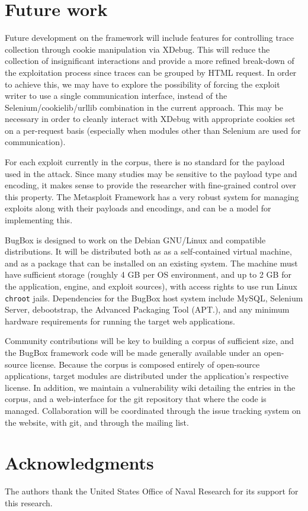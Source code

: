 \documentclass[letterpaper,twocolumn,10pt]{article}
\begin{document}
\section{Future work}
  Future development on the framework will include features for controlling trace collection through cookie manipulation via XDebug. This will reduce the collection of insignificant interactions and provide a more refined break-down of the exploitation process since traces can be grouped by HTML request. In order to achieve this, we may have to explore the possibility of forcing the exploit writer to use a single communication interface, instead of the Selenium/cookielib/urllib combination in the current approach. This may be necessary in order to cleanly interact with XDebug with appropriate cookies set on a per-request basis (especially when modules other than Selenium are used for communication).\par
For each exploit currently in the corpus, there is no standard for the payload used in the attack. Since many studies may be sensitive to the payload type and encoding, it makes sense to provide the researcher with fine-grained control over this property. The Metasploit Framework has a very robust system for managing exploits along with their payloads and encodings, and can be a model for implementing this.


BugBox is designed to work on the Debian GNU/Linux and compatible distributions.  It will be distributed both as as a self-contained virtual machine, and as a package that can be installed on an existing system. The machine must have sufficient storage (roughly 4 GB per OS environment, and up to 2 GB for the application, engine, and exploit sources), with access rights to use run Linux {\tt chroot} jails.  Dependencies for the BugBox host system include MySQL, Selenium Server, debootstrap, the Advanced Packaging Tool (APT.), and any minimum hardware requirements for running the target web applications.\par

Community contributions will be key to building a corpus of sufficient size, and the BugBox framework code will be made generally available under an open-source license. Because the corpus is composed entirely of open-source applications, target modules are distributed under the application's respective license. In addition, we maintain a vulnerability wiki detailing the entries in the corpus, and a web-interface for the git repository that where the code is managed. Collaboration will be coordinated through the issue tracking system on the website, with git, and through the mailing list.

\section*{Acknowledgments}

The authors thank the United States Office of Naval Research for its support for this research.

{\footnotesize 
}
\end{document}
